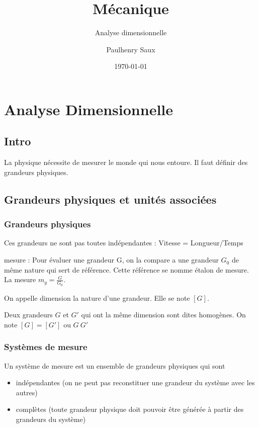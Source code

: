 \documentclass[french]{yLectureNote}
\title{Mécanique}
\subtitle{Analyse dimensionnelle}
\author{Paulhenry Saux}
\date{\today}
\begin{document}
\titleOne

	\chapter{Analyse Dimensionnelle }
	\section{Intro}
	La physique nécessite de mesurer le monde qui nous entoure. Il faut définir des grandeurs physiques.

	\section{Grandeurs physiques et unités associées}
	\subsection{Grandeurs physiques}

	Ces grandeurs ne sont pas toutes indépendantes : Vitesse = Longueur/Temps

	mesure : Pour évaluer une grandeur G, on la compare a une grandeur $G_0$ de m\^eme nature qui sert de référence. Cette référence se nomme étalon de mesure. La mesure $m_g = \frac{G}{G_0}$.

	On appelle dimension la nature d'une grandeur. Elle se note $[G]$.

	Deux grandeurs $G$ et $G'$ qui ont la m\^eme dimension sont dites homogènes. On note $[G] = [G']$ ou $G ~ G'$

	\subsection{Systèmes de mesure}
	Un système de mesure est un ensemble de grandeurs physiques qui sont

	\begin{itemize}
	 \item  indépendantes (on ne peut pas reconstituer une grandeur du système avec les autres)
	 \item complètes (toute grandeur physique doit pouvoir \^etre générée à partir des grandeurs du système)
	\end{itemize}
\end{document}
